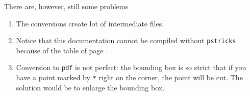 There are, however, still some problems
\begin{enumerate}

	\item
		The conversions create lot of intermediate files.
	\item
		Notice that this documentation cannot be compiled without \verb+pstricks+ because of the table of page \pageref{PgTableauMarques}.
	\item
		Conversion to \verb+pdf+ is not perfect: the bounding box is so strict that if you have a point marked by \verb+*+ right on the corner, the point will be cut. The solution would be to enlarge the bounding box.

\end{enumerate}


